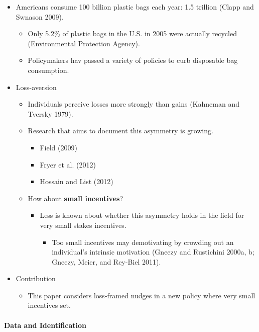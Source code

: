 \documentclass[../root]{subfiles}
\begin{document}
    \begin{itemize}
      \item Americans consume 100 billion plastic bags each year: 1.5 trillion (Clapp and Swnason 2009).
      \begin{itemize}
        \item Only 5.2\% of plastic bags in the U.S. in 2005 were actually recycled (Environmental Protection Agency).
        \item Policymakers hav passed a variety of policies to curb disposable bag consumption.
      \end{itemize}
      \item Loss-aversion
      \begin{itemize}
        \item Individuals perceive losses more strongly than gains (Kahneman and Tversky 1979).
        \item Research that aims to document this asymmetry is growing.
        \begin{itemize}
          \item Field (2009)
          \item Fryer et al. (2012)
          \item Hossain and List (2012)
        \end{itemize}
        \item How about \textbf{small incentives}?
        \begin{itemize}
          \item Less is known about whether this asymmetry holds in the field for very small stakes incentives.
          \begin{itemize}
            \item Too small incentives may demotivating by crowding out an individual's intrinsic motivation (Gneezy and Rustichini 2000a, b; Gneezy, Meier, and Rey-Biel 2011).
          \end{itemize}
        \end{itemize}
      \end{itemize}
      \item Contribution
      \begin{itemize}
        \item This paper considers loss-framed nudges in a new policy where very small incentives set.
      \end{itemize}
    \end{itemize}

    \paragraph{Data and Identification}
\end{document}

